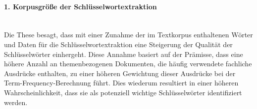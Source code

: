 \paragraph{1. Korpusgröße der Schlüsselwortextraktion}\mbox{}\\
Die These besagt, dass mit einer Zunahme der im Textkorpus enthaltenen Wörter und Daten für die Schlüsselwortextraktion eine Steigerung der Qualität der Schlüsselwörter einhergeht. Diese Annahme basiert auf der Prämisse, dass eine höhere Anzahl an themenbezogenen Dokumenten, die häufig verwendete fachliche Ausdrücke enthalten, zu einer höheren Gewichtung dieser Ausdrücke bei der Term-Frequency-Berechnung führt. Dies wiederum resultiert in einer höheren Wahrscheinlichkeit, dass sie als potenziell wichtige Schlüsselwörter identifiziert werden.\\

